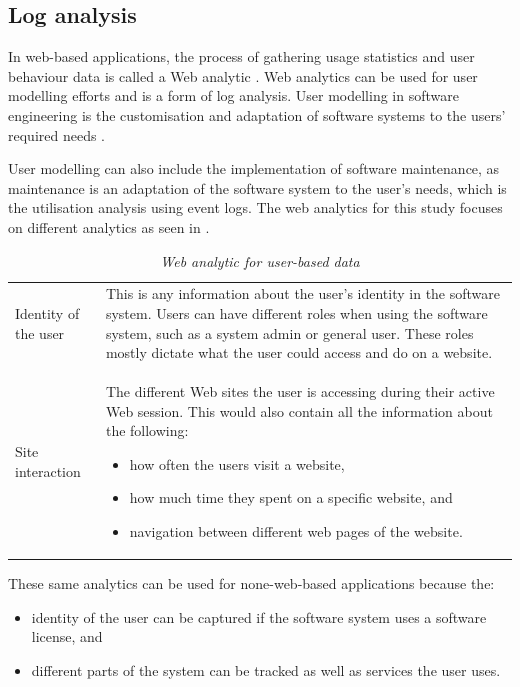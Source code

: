 \subsection{Log analysis}\label{sec:ch1_systemUtilisation}
In web-based applications, the process of gathering usage statistics and user behaviour data is called a Web analytic \cite{Kocsis2012}. Web analytics can be used for user modelling efforts and is a form of log analysis. User modelling in software engineering is the customisation and adaptation of software systems to the users' required needs \cite{Waqar2017, Paliouras1999}. \par User modelling can also include the implementation of software maintenance, as maintenance is an adaptation of the software system to the user's needs, which is the utilisation analysis using event logs. The web analytics for this study focuses on different analytics as seen in . 

\begin{table}[!htb]
	\centering
	\caption[Web analytic for user-based data]
	{\textit{Web analytic for user-based data}}
	\label{tbl:ch1_webAnalytics}
	\begin{tabularx}{\textwidth}{lX}
		\toprule 
		\thead{Analytic}  & \thead{Description} \\
		\midrule

		\rowcolor{lightgray}
		Identity of the user & This is any information about the user's identity in the software system. Users can have different roles when using the software system, such as a system admin or general user. These roles mostly dictate what the user could access and do on a website. \\

		Site interaction & The different Web sites the user is accessing during their active Web session. This would also contain all the information about the following: 
		\begin{itemize}
			\item how often the users visit a website,
			\item how much time they spent on a specific website, and
			\item navigation between different web pages of the website.
		\end{itemize}
		\\
		\bottomrule
	\end{tabularx}
\end{table}

These same analytics can be used for none-web-based applications because the: 
\begin{itemize}
	\item identity of the user can be captured if the software system uses a software license, and
	\item different parts of the system can be tracked as well as services the user uses.
\end{itemize} 

